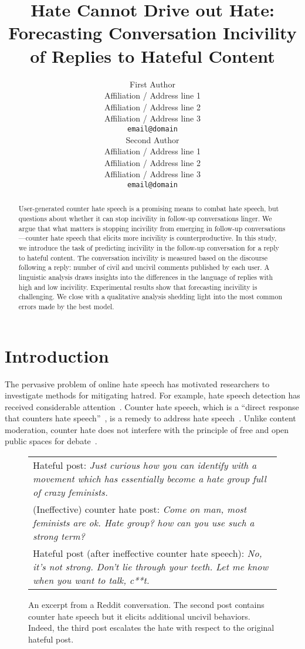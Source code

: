 \documentclass[11pt]{article}
\title{Hate Cannot Drive out Hate:\\Forecasting Conversation Incivility of Replies to Hateful Content}
\author{First Author \\
	Affiliation / Address line 1 \\
	Affiliation / Address line 2 \\
	Affiliation / Address line 3 \\
	\texttt{email@domain} \\\And
	Second Author \\
	Affiliation / Address line 1 \\
	Affiliation / Address line 2 \\
	Affiliation / Address line 3 \\
	\texttt{email@domain} \\}
\begin{document}
	\maketitle
	\begin{abstract}
		User-generated counter hate speech is a promising means to combat hate speech,
		but questions about whether it can stop incivility in follow-up conversations linger.
		We argue that what matters is stopping incivility from emerging in follow-up conversations---counter hate speech that elicits more incivility is counterproductive.
		In this study, we introduce the task of predicting incivility in the follow-up conversation for a reply to hateful content.
		The conversation incivility is measured based on the discourse following a reply: number of civil and uncivil comments published by each user.
		A linguistic analysis draws insights into the differences in the language of replies with high and low incivility.
		Experimental results show that forecasting incivility is challenging.
		We close with a qualitative analysis shedding light into the most common errors made by the best model.
	\end{abstract}
	
	\section{Introduction}
	The pervasive problem of online hate speech has motivated
	researchers to investigate methods for mitigating hatred.
	For example, hate speech detection has received considerable attention~\cite{schmidt-wiegand-2017-survey,10.1145/3232676}. 
	Counter hate speech, which is a ``direct response that counters hate speech''~\cite{DBLP:conf/icwsm/MathewSTRSMG019},
	is a remedy to address hate speech~\cite{richards2000counterspeech}. 
	Unlike content moderation,
	counter hate does not interfere with the principle of free and open public spaces for debate~\cite{DBLP:conf/icwsm/MathewSTRSMG019,schieb2016governing,chung-etal-2019-conan}.
	
	\begin{figure}
		\small
		\centering
		\begin{tabular}{@{}p{\columnwidth}@{}}
			\toprule
			Hateful post:
			\emph{Just curious how you can identify with a movement which has essentially become a hate group full of crazy feminists.}  \\ \addlinespace
			(Ineffective) counter hate post:
			\emph{Come on man, most feminists are ok. Hate group? how can you use such a strong term?}  \\ \addlinespace
			Hateful post (after ineffective counter hate speech):
			\emph{No, it’s not strong. Don’t lie through your teeth. Let me know when you want to talk, c**t.} \\ 
			\bottomrule
		\end{tabular}
		\caption{
			An excerpt from a Reddit conversation.
			The second post contains counter hate speech but it elicits additional uncivil behaviors.
			Indeed, the third post escalates the hate with respect to the original hateful post.
		}
		\label{f:problem-example}
	\end{figure}
	
\end{document}
